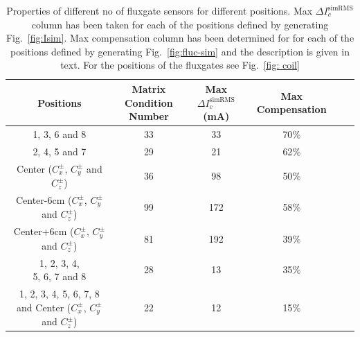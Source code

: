 \begin{table} [htb!]
    \centering
    \begin{tabular} { |c|c|c|c|c|c|} 
        \hline
        Positions & \makecell{Matrix \\Condition Number} &\makecell{Max $\Delta I_c^{\text{simRMS}}$\\ (mA)} & Max Compensation\\
        \hline\hline
        1, 3, 6 and 8 & 33 & 33 & 70$\%$ \\ 
        \hline
        2, 4, 5 and 7 & 29 & 21 & 62$\%$ \\ 
        \hline
        \makecell{Center \\($C_x^\pm$, $C_y^\pm$ and $C_z^\pm$)} & 36 & 98 & 50$\%$ \\ 
        \hline
        \makecell{Center-6cm \\($C_x^\pm$, $C_y^\pm$ and $C_z^\pm$)} & 99 & 172 & 58$\%$ \\ 
        \hline
        \makecell{Center+6cm \\($C_x^\pm$, $C_y^\pm$ and $C_z^\pm$)} & 81 & 192 & 39$\%$ \\ 
        \hline
        \makecell{1, 2, 3, 4, \\5, 6, 7 and 8} & 28 & 13 & 35$\%$ \\ 
        \hline
        \makecell{1, 2, 3, 4, \\5, 6, 7, 8 and \\Center ($C_x^\pm$, $C_y^\pm$ and $C_z^\pm$)}  & 22 & 12 & 15$\%$ \\ 
        \hline

    \end{tabular}
    \caption{Properties of different no of fluxgate sensors for different positions. Max $\Delta I_c^{\text{simRMS}}$ column has been taken for each of the positions defined by generating Fig.~\ref{fig:Isim}. Max compensation column has been determined for for each of the positions defined by generating Fig.~\ref{fig:fluc-sim} and the description is given in text. For the positions of the fluxgates see Fig.~\ref{fig: coil} }\label{table:flux-pos}
\end{table}

